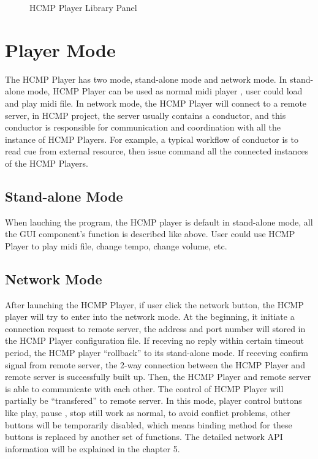 \begin{figure}[H]
\caption{HCMP Player Library Panel}
\label{fig:speciation}
\end{figure}

\section{Player Mode}

The HCMP Player has two mode, stand-alone mode and network mode. 
In stand-alone mode, HCMP Player can be used as normal midi player 
, user could load and play midi file. In network mode, 
the HCMP Player will connect to a remote 
server, in HCMP project, the server usually contains a conductor, and this
conductor is responsible for communication and coordination with all the 
instance of HCMP Players. For example, 
a typical workflow of conductor is to read cue from external resource, 
then issue command all the connected instances of the HCMP Players.

\subsection{Stand-alone Mode}

When lauching the program, the HCMP player is default in stand-alone mode, 
all the GUI component's function is described like above. 
User could use HCMP Player to play midi file, change tempo, change volume, etc.


\subsection{Network Mode}

After launching the HCMP Player, if user click the network button, 
the HCMP player will try to enter into    
the network mode. At the beginning, it initiate a connection request 
to remote server, the address and port number will stored in the
HCMP Player configuration file. If receving no reply within certain 
timeout period, the HCMP player ``rollback'' to its stand-alone mode.
If receving confirm signal from
remote server, the 2-way connection between the HCMP Player and 
remote server is successfully built up. Then, the HCMP Player and 
remote server is able to communicate with each other. The control of HCMP 
Player will partially be ``transfered'' to remote server. 
In this mode, player control buttons like play, pause   
, stop still work as normal, to avoid conflict problems, other buttons will 
be temporarily disabled, which means binding method for these buttons is replaced by
another set of functions. The detailed network API information will be explained  
in the chapter 5.
